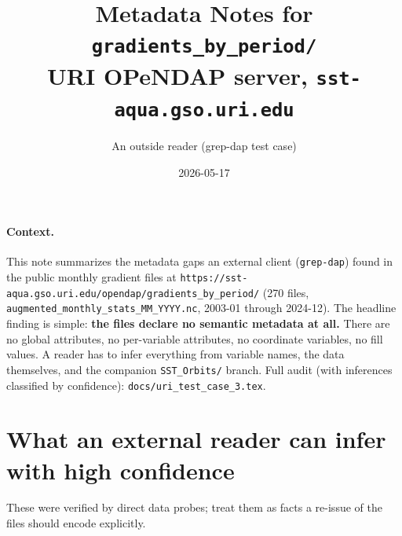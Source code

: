 \documentclass[11pt]{article}
\title{Metadata Notes for \texttt{gradients\_by\_period/}\\
       \large URI OPeNDAP server, \texttt{sst-aqua.gso.uri.edu}}
\author{An outside reader (grep-dap test case)}
\date{2026-05-17}
\begin{document}
\maketitle

\paragraph{Context.}
This note summarizes the metadata gaps an external client
(\texttt{grep-dap}) found in the public monthly gradient files at
\texttt{https://sst-aqua.gso.uri.edu/opendap/gradients\_by\_period/}
(270 files, \texttt{augmented\_monthly\_stats\_MM\_YYYY.nc},
2003-01 through 2024-12). The headline finding is simple: \textbf{the
files declare no semantic metadata at all.} There are no global
attributes, no per-variable attributes, no coordinate variables, no
fill values. A reader has to infer everything from variable names,
the data themselves, and the companion \texttt{SST\_Orbits/} branch.
Full audit (with inferences classified by confidence): \texttt{docs/uri\_test\_case\_3.tex}.

\section*{What an external reader can infer with high confidence}

These were verified by direct data probes; treat them as facts a
re-issue of the files should encode explicitly.
\end{document}
